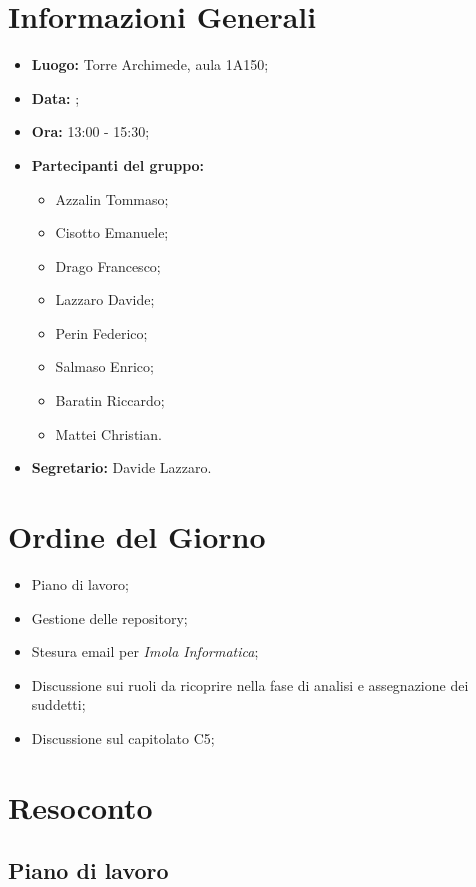 \section{Informazioni Generali}
\begin{itemize}
\item \textbf{Luogo:} Torre Archimede, aula 1A150;
\item \textbf{Data:} \Data;
\item \textbf{Ora:} 13:00 - 15:30;
\item \textbf{Partecipanti del gruppo:}
	\begin{itemize}
	\item Azzalin Tommaso; 
	\item Cisotto Emanuele; 
	\item Drago Francesco;
	\item Lazzaro Davide;
	\item Perin Federico;
	\item Salmaso Enrico;
	\item Baratin Riccardo;
	\item Mattei Christian.
	\end{itemize} 
\item \textbf{Segretario:} Davide Lazzaro.
\end{itemize}


\section{Ordine del Giorno}
\begin{itemize}
\item Piano di lavoro;
\item Gestione delle repository;
\item Stesura email per \textit{Imola Informatica};
\item Discussione sui ruoli da ricoprire nella fase di analisi e assegnazione dei suddetti;
\item Discussione sul capitolato C5;
\end{itemize}



\section{Resoconto}
\subsection{Piano di lavoro}

